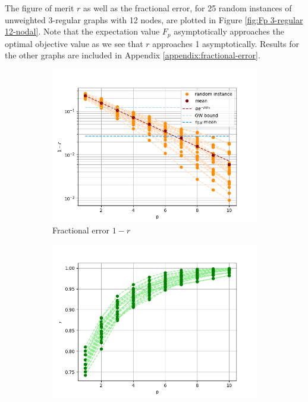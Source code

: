 The figure of merit $r$ as well as the fractional error, for 25 random instances of unweighted 3-regular graphs with 12 nodes, are plotted in Figure \ref{fig:Fp 3-regular 12-nodal}. Note that the expectation value $F_p$ asymptotically approaches the optimal objective value as we see that $r$ approaches 1 asymptotically. Results for the other graphs are included in Appendix \ref{appendix:fractional-error}.

\begin{figure}[H]
	\centering
	\begin{subfigure}[t]{0.48\textwidth}
		\centering
		\includegraphics[width=\textwidth]{figures/interp/FOM_12_high_p.png}
		\caption{Fractional error $1-r$}
	\end{subfigure}
	\begin{subfigure}[t]{0.48\textwidth}
		\centering
		\includegraphics[width=\textwidth]{figures/interp/r_3-regular_12-nodal.png}

\end{subfigure}
\end{figure}
